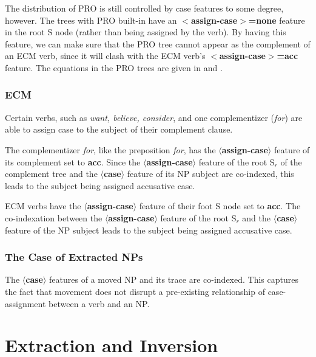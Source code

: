 The distribution of PRO is still controlled by case features to some degree,
however. The trees with PRO built-in have an {\bf $<$assign-case$>$=none}
feature in the root S node (rather than being assigned by the verb). By having
this feature, we can make sure that the PRO tree cannot appear as the
complement of an ECM verb, since it will clash with the ECM verb's {\bf
$<$assign-case$>$=acc} feature. The equations in the PRO trees are given in
 and .




\subsubsection{ECM}
Certain verbs, such as {\em want, believe, consider}, and one complementizer
({\em for}) are able to assign case to the subject of their complement clause. 

The complementizer {\em for}, like the preposition {\em for}, has the
{\bf $\langle$assign-case$\rangle$} feature of its complement set to
{\bf acc}. Since the {\bf $\langle$assign-case$\rangle$} feature of
the root S$_{r}$ of the complement tree and the {\bf
$\langle$case$\rangle$} feature of its NP subject are co-indexed, this
leads to the subject being assigned accusative case.

ECM verbs have the {\bf $\langle$assign-case$\rangle$}  feature of their
foot S node set to {\bf acc}. The co-indexation between the 
{\bf $\langle$assign-case$\rangle$} feature of
the root S$_{r}$ and the {\bf $\langle$case$\rangle$} feature of the NP subject
leads to the subject being assigned accusative case.

\subsubsection{The Case of Extracted NPs}
The {\bf $\langle$case$\rangle$} features of a moved NP and its trace 
are co-indexed. This captures the fact that movement does not disrupt 
a pre-existing relationship of case-assignment between a verb and an NP.



\section{Extraction and Inversion}

